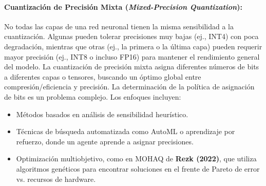 \documentclass[12pt]{article}
\begin{document}
\paragraph{Cuantización de Precisión Mixta (\textit{Mixed-Precision Quantization}):}
No todas las capas de una red neuronal tienen la misma sensibilidad a la cuantización. Algunas pueden tolerar precisiones muy bajas (ej., INT4) con poca degradación, mientras que otras (ej., la primera o la última capa) pueden requerir mayor precisión (ej., INT8 o incluso FP16) para mantener el rendimiento general del modelo. La cuantización de precisión mixta asigna diferentes números de bits a diferentes capas o tensores, buscando un óptimo global entre compresión/eficiencia y precisión.
La determinación de la política de asignación de bits es un problema complejo. Los enfoques incluyen:
\begin{itemize}
    \item Métodos basados en análisis de sensibilidad heurístico.
    \item Técnicas de búsqueda automatizada como AutoML o aprendizaje por refuerzo, donde un agente aprende a asignar precisiones.
    \item Optimización multiobjetivo, como en MOHAQ de \textbf{Rezk (2022)}\cite{Rezk2022MOHAQ}, que utiliza algoritmos genéticos para encontrar soluciones en el frente de Pareto de error vs. recursos de hardware.
\end{itemize}
\end{document}
